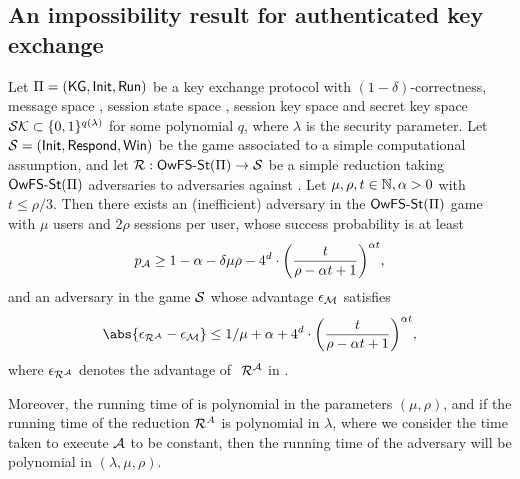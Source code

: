 \subsection{An impossibility result for authenticated key exchange}

\begin{theorem}\label{thm:owfsst}
  Let \(\mathrm{\Pi}{} = (\mathsf{KG}, \mathsf{Init}, \mathsf{Run})\) be a key exchange protocol
  with \((1-\delta)\)-correctness,
  message space \setM, session state space \setST, session key space \keyspace
  and secret key space \(\mathcal{SK} \subset \{0,1\}^{q(\lambda)}\) for some polynomial \(q\),
  where \(\lambda\) is the security parameter.
  Let \(\mathcal{S} = (\mathsf{Init}, \mathsf{Respond}, \mathsf{Win})\) be the game associated to a simple computational assumption,
  and let \(\redR : \OwFSst(\prot) \to \Simple\) be a simple reduction
  taking \(\mathsf{OwFS}\text{-}\mathsf{St}(\mathrm{\Pi})\) adversaries to adversaries against \Simple.
  Let \(\mu,\rho,t \in \mathbb{N}, \alpha > 0\) with \(t \le \rho/3\).
  Then there exists an (inefficient) adversary \advA in the \(\mathsf{OwFS}\text{-}\mathsf{St}(\mathrm{\Pi})\) game
  with \(\mu\) users and \(2\rho\) sessions per user, whose success probability is at least
  \begin{equation}\label{ineq:owfsst:A}
    p_{\advA} \ge 1 - \alpha - \delta \mu \rho
    - 4^{d} \cdot \left( \frac{t}{\rho - \alpha t + 1} \right)^{\alpha t},
  \end{equation}
  and an adversary \redM in the game \(\mathcal{S}\)
  whose advantage \(\epsilon_{\mathcal{M}}\) satisfies
  \begin{equation}\label{ineq:owfsst:M}
    \abs{\epsilon_{\redR^{\advA}} - \epsilon_{\redM}} \le 1/\mu + \alpha
    + 4^{d} \cdot \left( \frac{t}{\rho - \alpha t + 1} \right)^{\alpha t},
  \end{equation}
  where \(\epsilon_{\redR^{\advA}}\) denotes the advantage of \(\text{ }\redR^{\advA}\) in \Simple.

  Moreover, the running time of \redM is polynomial in the parameters \((\mu, \rho)\),
  and if the running time of the reduction \(\redR^{A}\) is polynomial in \(\lambda\),
  where we consider the time taken to execute \(\mathcal{A}\) to be constant,
  then the running time of the adversary \redM will be polynomial in \((\lambda,\mu,\rho)\).
\end{theorem}

